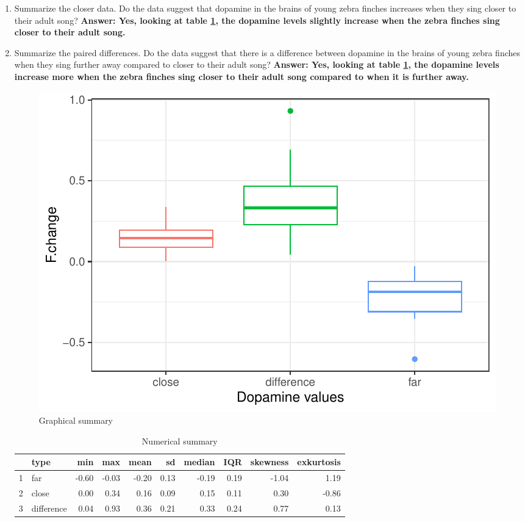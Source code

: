 \documentclass{article}\usepackage[]{graphicx}\usepackage[]{xcolor}
\makeatletter
\def\maxwidth{ %
  \ifdim\Gin@nat@width>\linewidth
    \linewidth
  \else
    \Gin@nat@width
  \fi
}
\newenvironment{knitrout}{}{} %
\makeatother
\begin{document}
\begin{enumerate}
\begin{enumerate}
   \item Summarize the closer data. Do the data suggest that
   dopamine in the brains of young zebra finches increases when
   they sing closer to their adult song?\newline
   \textbf{Answer: Yes, looking at table \ref{table1}, the dopamine levels slightly increase when the zebra finches sing closer to their adult song. }
   
  \item Summarize the paired differences. Do the data suggest
  that there is a difference between dopamine in the brains of
  young zebra finches when they sing further away compared to 
  closer to their adult song? 
  \newline
  \textbf{Answer: Yes, looking at table \ref{table1}, the dopamine levels increase more when the zebra finches sing closer to their adult song compared to when it is further away. }
  
  \begin{figure}[H]
\begin{center}
\begin{knitrout}
\color{fgcolor}
\includegraphics[width=\maxwidth]{figure/unnamed-chunk-3-1} 
\end{knitrout}
\caption{Graphical summary}
\label{plot1} 
\end{center}
\end{figure}

\begin{table}[H]
\centering
\begin{tabular}{rlrrrrrrrr}
  \hline
 & type & min & max & mean & sd & median & IQR & skewness & exkurtosis \\ 
  \hline
1 & far & -0.60 & -0.03 & -0.20 & 0.13 & -0.19 & 0.19 & -1.04 & 1.19 \\ 
  2 & close & 0.00 & 0.34 & 0.16 & 0.09 & 0.15 & 0.11 & 0.30 & -0.86 \\ 
  3 & difference & 0.04 & 0.93 & 0.36 & 0.21 & 0.33 & 0.24 & 0.77 & 0.13 \\ 
   \hline
\end{tabular} \caption{Numerical summary} \label{table1}
\end{table}


\end{enumerate}
\end{enumerate}
\end{document}
